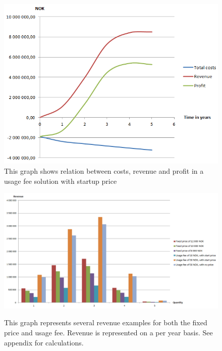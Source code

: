 \begin{figure}
\begin{center}
\includegraphics[scale=0.8]{profitusagefee}
\caption[Profit, Revenue and Cost for a Usage Fee Solution]{This graph shows relation between costs, revenue and profit in a usage fee solution with startup price}
\label{fig:ProfitUsageFee}
\end{center}
\end{figure}

\begin{figure}
\centering
\scalebox{0.55}
{\includegraphics{revenueall}}
\caption[Revenue examples for both fixed price model and usage fee model]{This graph represents several revenue examples for both the fixed price and usage fee. Revenue is represented on a per year basis. See appendix for calculations.}
\label{fig:RevenueAll}
\end{figure}

